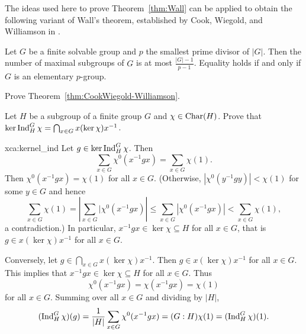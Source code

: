 The ideas used here to prove Theorem~\ref{thm:Wall} can be applied 
to obtain the following variant of Wall’s theorem, established  
by Cook, Wiegold, and Williamson in \cite{MR896628}.

\begin{theorem}
    \label{thm:CookWiegold-Williamson}
    Let $G$ be a finite solvable group and $p$ the smallest prime divisor of $|G|$. 
    Then the number of maximal subgroups of $G$ is at most $\frac{|G|-1}{p-1}$. Equality 
    holds if and only if $G$ is an elementary $p$-group.  
\end{theorem}

\begin{bonus}
    Prove Theorem~\ref{thm:CookWiegold-Williamson}.    
\end{bonus}

\begin{exercise}
    \label{xca:kernel_ind}
    Let $H$ be a subgroup of a finite group $G$ and 
    $\chi\in\operatorname{Char}(H)$. Prove that 
    $\ker\operatorname{Ind}_H^G\chi=\bigcap_{x\in G}x(\ker\chi)x^{-1}$. 
\end{exercise}

\begin{sol}{xca:kernel_ind}
    Let $g\in\ker\operatorname{Ind}_H^G\chi$. Then \[
    \sum_{x\in G}\chi^0(x^{-1}gx)=\sum_{x\in G}\chi(1).
    \]
    Then $\chi^0(x^{-1}gx)=\chi(1)$ for all $x\in G$. (Otherwise, $|\chi^0(y^{-1}gy)|<\chi(1)$ for some
    $y\in G$ and hence 
    \[
    \sum_{x\in G}\chi(1)=\left|\sum_{x\in G}|\chi^0(x^{-1}gx)\right|
    \leq\sum_{x\in G}|\chi^0(x^{-1}gx)|<\sum_{x\in G}\chi(1),
    \]
    a contradiction.) In particular, $x^{-1}gx\in\ker\chi\subseteq H$ for all $x\in G$, that 
    is $g\in x(\ker\chi)x^{-1}$ for all $x\in G$. 
    
    Conversely, let $g\in\bigcap_{x\in G}x(\ker\chi)x^{-1}$. Then $g\in x(\ker\chi)x^{-1}$ for all $x\in G$. 
    This implies that $x^{-1}gx\in\ker\chi\subseteq H$ for all $x\in G$. Thus 
    \[
    \chi^0(x^{-1}gx)=\chi(x^{-1}gx)=\chi(1)
    \]
    for all $x\in G$. Summing over all $x\in G$ and dividing by $|H|$, 
    \[
    (\operatorname{Ind}_H^G\chi)(g)=\frac{1}{|H|}\sum_{x\in G}\chi^0(x^{-1}gx)=(G:H)\chi(1)=(\operatorname{Ind}_H^G\chi)(1).
    \]
\end{sol}

